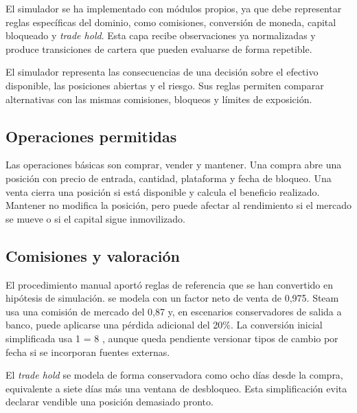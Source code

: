 El simulador se ha implementado con módulos propios, ya que debe representar reglas específicas del dominio, como comisiones, conversión de moneda, capital bloqueado y \textit{trade hold}. Esta capa recibe observaciones ya normalizadas y produce transiciones de cartera que pueden evaluarse de forma repetible.

El simulador representa las consecuencias de una decisión sobre el efectivo disponible, las posiciones abiertas y el riesgo. Sus reglas permiten comparar alternativas con las mismas comisiones, bloqueos y límites de exposición.

\subsection{Operaciones permitidas}

Las operaciones básicas son comprar, vender y mantener. Una compra abre una posición con precio de entrada, cantidad, plataforma y fecha de bloqueo. Una venta cierra una posición si está disponible y calcula el beneficio realizado. Mantener no modifica la posición, pero puede afectar al rendimiento si el mercado se mueve o si el capital sigue inmovilizado.

\subsection{Comisiones y valoración}

El procedimiento manual aportó reglas de referencia que se han convertido en hipótesis de simulación.  se modela con un factor neto de venta de 0,975. Steam usa una comisión de mercado del 0,87 y, en escenarios conservadores de salida a banco, puede aplicarse una pérdida adicional del 20\%. La conversión inicial simplificada usa 1  = 8 , aunque queda pendiente versionar tipos de cambio por fecha si se incorporan fuentes externas.

El \textit{trade hold} se modela de forma conservadora como ocho días desde la compra, equivalente a siete días más una ventana de desbloqueo. Esta simplificación evita declarar vendible una posición demasiado pronto.
